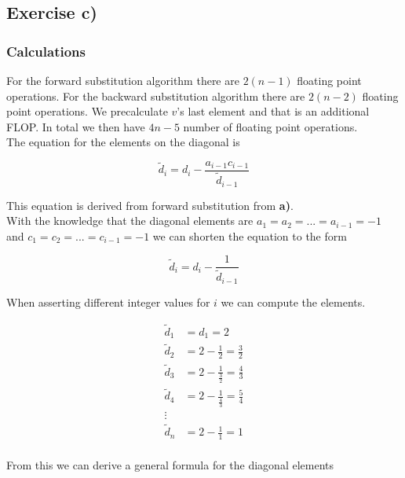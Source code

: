 \documentclass{article}
\begin{document}
\subsection{Exercise c)} \label{Method c)}

  \subsubsection{Calculations}

    For the forward substitution algorithm there are $2(n-1)$ floating point operations. For the backward substitution algorithm there are $2(n-2)$ floating point operations. We precalculate $v$'s last element and that is an additional FLOP. In total we then have $4n - 5$ number of floating point operations. \\

    The equation for the elements on the diagonal is

    \begin{equation*}
      \tilde{d}_i = d_i - \frac{a_{i-1} c_{i-1}}{\tilde{d}_{i-1}}
    \end{equation*}

    This equation is derived from forward substitution from \textbf{a)}. \\

    With the knowledge that the diagonal elements are $a_1 = a_2 = ... = a_{i-1} = -1 $ and $c_1 = c_2 = ... = c_{i-1} = -1$ we can shorten the equation to the form

    \begin{equation*}
      \tilde{d}_i = d_i - \frac{1}{\tilde{d}_{i-1}}
    \end{equation*}

    When asserting different integer values for $i$ we can compute the elements.

    \begin{align*}
      \tilde{d}_1 &= d_1 = 2 \\
      \tilde{d}_2 &= 2 - \frac{1}{2} = \frac{3}{2} \\
      \tilde{d}_3 &= 2 - \frac{1}{\frac{3}{2}} = \frac{4}{3} \\
      \tilde{d}_4 &= 2 - \frac{1}{\frac{4}{3}} = \frac{5}{4} \\
      \vdots \\
      \tilde{d}_n &= 2 - \frac{1}{1} = 1 \\
    \end{align*}

    From this we can derive a general formula for the diagonal elements
\end{document}
